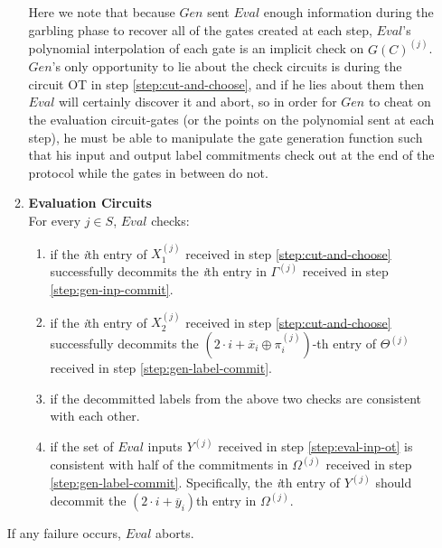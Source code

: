 \documentclass{article}
\begin{document}
\begin{enumerate}
\begin{enumerate}[label=(\alph*)]
		Here we note that because $Gen$ sent $Eval$ enough information during the garbling phase to recover all of the gates created at each step, $Eval$'s polynomial interpolation of each gate is an implicit check on $G(C)^{(j)}$. $Gen$'s only opportunity to lie about the check circuits is during the circuit OT in step \ref{step:cut-and-choose}, and if he lies about them then $Eval$ will certainly discover it and abort, so in order for $Gen$ to cheat on the evaluation circuit-gates (or the points on the polynomial sent at each step), he must be able to manipulate the gate generation function such that his input and output label commitments check out at the end of the protocol while the gates in between do not.  
		\item \textbf{Evaluation Circuits}\\
		For every $j \in S$, $Eval$ checks:
		\begin{enumerate}[label=\roman*]
			\item if the \emph{i}th entry of $X_{1}^{(j)}$ received in step \ref{step:cut-and-choose} successfully decommits the \emph{i}th entry in $\Gamma^{(j)}$ received in step \ref{step:gen-inp-commit}.
			\item if the \emph{i}th entry of $X_{2}^{(j)}$ received in step \ref{step:cut-and-choose} successfully decommits the $(2\cdot i + \overline{x}_{i} \oplus \pi_{i}^{(j)})$-th entry of $\Theta^{(j)}$ received in step \ref{step:gen-label-commit}.
			\item if the decommitted labels from the above two checks are consistent with each other.
			\item if the set of $Eval$ inputs $Y^{(j)}$ received in step \ref{step:eval-inp-ot} is consistent with half of the commitments in $\Omega^{(j)}$ received in step \ref{step:gen-label-commit}. Specifically, the \emph{i}th entry of $Y^{(j)}$ should decommit the $(2\cdot i + \overline{y}_{i})$th entry in $\Omega^{(j)}$.
		\end{enumerate}
	\end{enumerate}
	If any failure occurs, $Eval$ aborts.
	

\end{enumerate}
\end{document}
